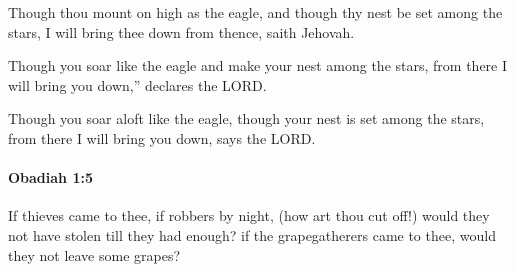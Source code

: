 			\begin{versebox}
					\item[BHS] 
					\item[LXX] 
					\item[ASV] Though thou mount on high as the eagle, and though thy nest be set among the stars, I will bring thee down from thence, saith Jehovah.
					\item[NIV] Though you soar like the eagle and make your nest among the stars, from there I will bring you down,” declares the LORD.
					\item[NRSV] Though you soar aloft like the eagle, though your nest is set among the stars, from there I will bring you down, says the LORD.
			\end{versebox}

		\paragraph{Obadiah 1:5} %
			\label{OBADIAH-1-5}

			If thieves came to thee, if robbers by night, (how art thou cut off!) would they not have stolen till they had enough? if the grapegatherers came to thee, would they not leave some grapes?

